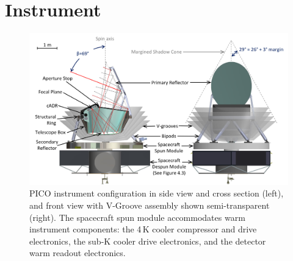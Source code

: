 \newcommand\pdeg{.\!\!\degree}
\newcommand\parcm{.\!\!'}

\section{Instrument}
\label{sec:instrument} %

\begin{figure}
\hspace{-0.1in}
\parbox{5.1in}{\centerline{
\includegraphics[width=5.25in]{figures/InstrumentCAD.png} }}
\hspace{0.05in}
\parbox{1.3in}{
\caption{\captiontext
PICO instrument configuration in side view and cross section (left), and front view with V-Groove assembly shown semi-transparent (right).  The spacecraft spun module accommodates warm instrument components: the 4\,K cooler compressor and drive electronics, the sub-K cooler drive electronics, and the detector warm readout electronics. 
\label{fig:InstrumentCAD}} }
\vspace{-0.1in}
\end{figure}

